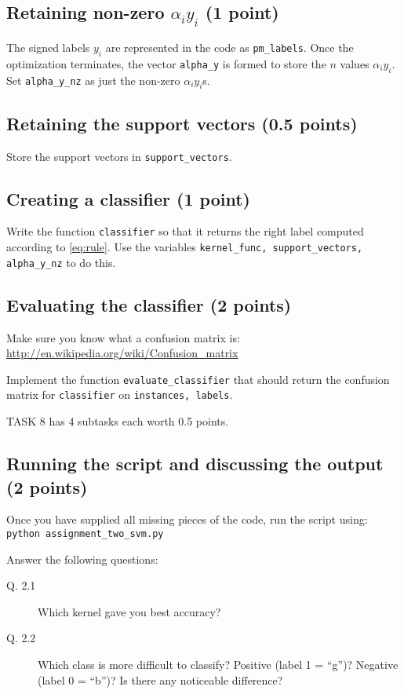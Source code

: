 \documentclass{article}
\begin{document}
\subsection{Retaining non-zero $\alpha_i y_i$ (1 point)}

The signed labels $y_i$ are represented in the code as {\tt pm\_labels}. Once the optimization terminates, the vector {\tt alpha\_y} is formed
to store the $n$ values $\alpha_i y_i$. Set {\tt alpha\_y\_nz} as just the non-zero $\alpha_i y_i$s.

\subsection{Retaining the support vectors (0.5 points)}

Store the support vectors in {\tt support\_vectors}.

\subsection{Creating a classifier (1 point)}

Write the function {\tt classifier} so that it returns the right label computed according to \eqref{eq:rule}. Use the variables
{\tt kernel\_func, support\_vectors, alpha\_y\_nz} to do this.

\subsection{Evaluating the classifier (2 points)}

Make sure you know what a confusion matrix is:
\url{http://en.wikipedia.org/wiki/Confusion\_matrix}

Implement the function {\tt evaluate\_classifier} that should return the confusion matrix for {\tt classifier} on {\tt instances, labels}.

TASK 8 has 4 subtasks each worth 0.5 points.

\subsection{Running the script and discussing the output (2 points)}

Once you have supplied all missing pieces of the code, run the script using:\\
{\tt python assignment\_two\_svm.py}

Answer the following questions:
\begin{description}
\item[Q. 2.1]
Which kernel gave you best accuracy?
\item[Q. 2.2]
Which class is more difficult to classify? Positive (label 1 = ``g'')? Negative (label 0 = ``b'')? Is there any noticeable difference?
\end{description}
\end{document}
